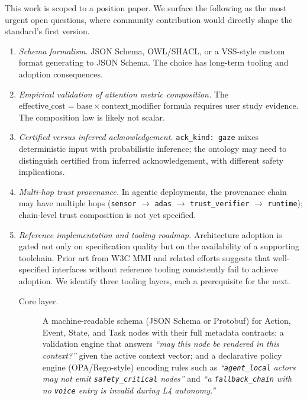 \documentclass[manuscript,screen,review,anonymous]{acmart}
\begin{document}
This work is scoped to a position paper. We surface the following as the most
urgent open questions, where community contribution would directly shape the
standard's first version.

\begin{enumerate}
  \item \emph{Schema formalism.} JSON Schema, OWL/SHACL, or a VSS-style custom
    format generating to JSON Schema. The choice has long-term tooling and
    adoption consequences.

  \item \emph{Empirical validation of attention metric composition.} The
    $\text{effective\_cost} = \text{base} \times \text{context\_modifier}$
    formula requires user study evidence. The composition law is likely not
    scalar.

  \item \emph{Certified versus inferred acknowledgement.}
    \texttt{ack\_kind: gaze} mixes deterministic input with probabilistic
    inference; the ontology may need to distinguish certified from inferred
    acknowledgement, with different safety implications.

  \item \emph{Multi-hop trust provenance.} In agentic deployments, the
    provenance chain may have multiple hops (\texttt{sensor} $\to$
    \texttt{adas} $\to$ \texttt{trust\_verifier} $\to$ \texttt{runtime});
    chain-level trust composition is not yet specified.

  \item \emph{Reference implementation and tooling roadmap.} Architecture
    adoption is gated not only on specification quality but on the availability
    of a supporting toolchain. Prior art from W3C MMI and related efforts
    suggests that well-specified interfaces without reference tooling
    consistently fail to achieve adoption. We identify three tooling layers,
    each a prerequisite for the next.

    \begin{description}
      \item[Core layer.]
        A machine-readable schema (JSON Schema or Protobuf) for Action, Event,
        State, and Task nodes with their full metadata contracts; a validation
        engine that answers \emph{``may this node be rendered in this
        context?''} given the active context vector; and a declarative policy
        engine (OPA/Rego-style) encoding rules such as
        \emph{``\texttt{agent\_local} actors may not emit
        \texttt{safety\_critical} nodes''} and \emph{``a
        \texttt{fallback\_chain} with no \texttt{voice} entry is invalid during
        L4 autonomy.''}


\end{description}
\end{enumerate}
\end{document}
